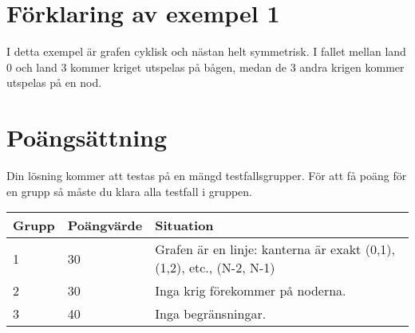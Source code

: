 \section*{Förklaring av exempel 1}

I detta exempel är grafen cyklisk och nästan helt symmetrisk. I fallet mellan
land 0 och land 3 kommer kriget utspelas på bågen, medan de 3 andra krigen
kommer utspelas på en nod.

\section*{Poängsättning}

Din lösning kommer att testas på en mängd testfallsgrupper. För att få poäng för en grupp
så måste du klara alla testfall i gruppen.

\begin{tabular}{| l | l | l |}
\hline
Grupp & Poängvärde & Situation \\ \hline
1     & 30         & Grafen är en linje: kanterna är exakt (0,1), (1,2), etc., (N-2, N-1) \\ \hline
2     & 30         & Inga krig förekommer på noderna. \\ \hline
3     & 40         & Inga begränsningar. \\ \hline
\end{tabular}

